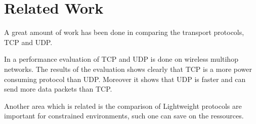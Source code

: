 \section{Related Work}
A great amount of work has been done in comparing the transport protocols, TCP and UDP. 

In \cite{giannoulis2009tcp} a performance evaluation of TCP and UDP is done on wireless multihop networks. The results of the evaluation shows clearly that TCP is a more power consuming protocol than UDP. Moreover it shows that UDP is faster and can send more data packets than TCP.


Another area which is related is the comparison of  
Lightweight protocols are important for constrained environments, such one can save on the ressources. 






